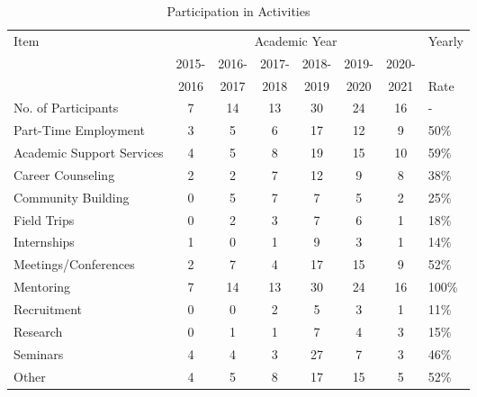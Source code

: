 \documentclass{article}
\begin{document}
\begin{table}[h]
\scriptsize
\centering
\caption{Participation in Activities} 
\begin{tabular}{|l|c|c|c|c|c|c|l|}
  \hline 
  \multirow{2}{*}{Item} & \multicolumn{6}{|c|}{Academic Year} & \multirow{2}{*}{Yearly} \\
  \cline{2-7}
   & 2015- & 2016- & 2017- & 2018- & 2019- & 2020- &  \\
     & 2016 & 2017 & 2018 & 2019 & 2020 & 2021 & Rate \\
   \hline
  No. of Participants & 7 & 14 & 13 & 30 & 24 & 16 & -  \\
  Part-Time Employment & 3 & 5 & 6 & 17 & 12 & 9 & 50\%\\
  Academic Support Services &	4 & 5 & 8 & 19 & 15 & 10 & 59\% \\
  Career Counseling & 2 & 2 & 7 & 12 & 9 & 8 & 38\% \\
  Community Building & 0 & 5 & 7 & 7 & 5& 2& 25\%  \\
  Field Trips	& 0	& 2	& 3	& 7	& 6	& 1	& 18\%  \\
  Internships	& 1	& 0	& 1	& 9	& 3	& 1	& 14\% \\
  Meetings/Conferences & 2 & 7 & 4 & 17 & 15 & 9 & 52\% \\
  Mentoring & 7 & 14 & 13 & 30 & 24 & 16 & 100\% \\
  Recruitment & 0	& 0	& 2	& 5	& 3	& 1	& 11\%  \\
  Research & 0 & 1 & 1 & 7 & 4 & 3 & 15\%  \\
  Seminars & 4 & 4 & 3 & 27 & 7 & 3 & 46\% \\
  Other & 4 & 5 & 8 & 17 & 15	& 5	& 52\% \\
  \hline
\end{tabular}
\end{table}
\end{document}
